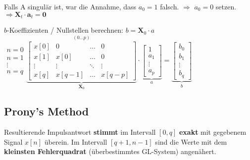 \begin{aufzaehlung}
		\vspace{-0.5cm}
		Falls A singulär ist, war die Annahme, dass $a_0 = 1$ falsch. $\Longrightarrow$ $a_0=0$ setzen. 
		$ \Longrightarrow \bm X_t \cdot \bm a_t = \bm 0$
		
  		\item $b$-Koeffizienten / Nullstellen berechnen: $b = \bm X_0 \cdot a$ \small \hspace{0.5cm}
		$ \begin{matrix} n=0\\ n=1\\ \vdots\\ n=q \end{matrix} \overset{(0 \hdots p)}{\underbrace{\begin{bmatrix}
    		x[0] & 0 & \hdots & 0 \\
    		x[1] & x[0] & \hdots & 0 \\
    		\vdots & \vdots & \ddots & \vdots \\
    		x[q] & x[q-1] & \hdots & x[q-p]
		\end{bmatrix}  }_{\bm X_0}}\cdot \underbrace{\begin{bmatrix}
    		1 \\
    		a_1 \\
    		\vdots \\
    		a_p
		\end{bmatrix}  }_{a}= 	\underbrace{\begin{bmatrix}
	    		b_0 \\
	    		b_1 \\
	    		\vdots \\
	    		b_q
			\end{bmatrix}}_{b}$ \normalsize
			
	\end{aufzaehlung}
	
\vspace{-1.0cm}


\subsection{Prony's Method }
Resultierende Impulsantwort \textbf{stimmt} im Intervall $[0, q]$ \textbf{exakt} mit
gegebenem Signal $x[n]$ überein. Im Intervall $[q + 1, n-1]$ sind die
Werte mit dem \textbf{kleinsten Fehlerquadrat} (überbestimmtes GL-System)
angenähert. 

\renewcommand{\arraystretch}{1.0}

